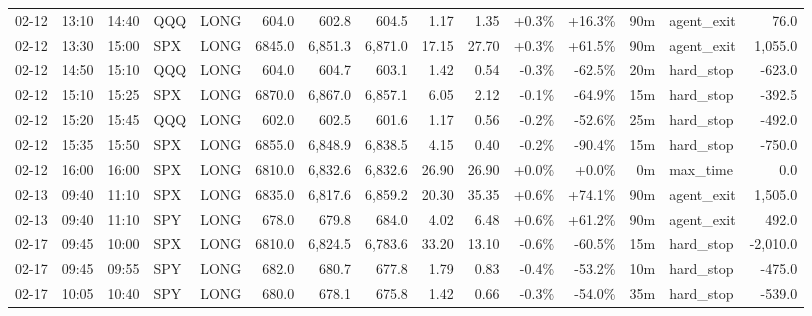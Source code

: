 \documentclass[11pt,a4paper,twoside]{article}
\begin{document}
\begin{landscape}
\begin{center}
\begin{longtable}{>{\color{txtmain}}l l l l l r r r r r r r r >{\color{txtmain}}l r}
02-12 & 13:10 & 14:40 & QQQ & LONG & 604.0 & 602.8 & 604.5 & 1.17 & 1.35 & \textcolor{wingreen}{+0.3\%} & \textcolor{wingreen}{+16.3\%} & 90m & agent\_exit & \textcolor{wingreen}{76.0} \\
02-12 & 13:30 & 15:00 & SPX & LONG & 6845.0 & 6,851.3 & 6,871.0 & 17.15 & 27.70 & \textcolor{wingreen}{+0.3\%} & \textcolor{wingreen}{+61.5\%} & 90m & agent\_exit & \textcolor{wingreen}{1,055.0} \\
02-12 & 14:50 & 15:10 & QQQ & LONG & 604.0 & 604.7 & 603.1 & 1.42 & 0.54 & \textcolor{lossred}{-0.3\%} & \textcolor{lossred}{-62.5\%} & 20m & hard\_stop & \textcolor{lossred}{-623.0} \\
02-12 & 15:10 & 15:25 & SPX & LONG & 6870.0 & 6,867.0 & 6,857.1 & 6.05 & 2.12 & \textcolor{lossred}{-0.1\%} & \textcolor{lossred}{-64.9\%} & 15m & hard\_stop & \textcolor{lossred}{-392.5} \\
02-12 & 15:20 & 15:45 & QQQ & LONG & 602.0 & 602.5 & 601.6 & 1.17 & 0.56 & \textcolor{lossred}{-0.2\%} & \textcolor{lossred}{-52.6\%} & 25m & hard\_stop & \textcolor{lossred}{-492.0} \\
02-12 & 15:35 & 15:50 & SPX & LONG & 6855.0 & 6,848.9 & 6,838.5 & 4.15 & 0.40 & \textcolor{lossred}{-0.2\%} & \textcolor{lossred}{-90.4\%} & 15m & hard\_stop & \textcolor{lossred}{-750.0} \\
02-12 & 16:00 & 16:00 & SPX & LONG & 6810.0 & 6,832.6 & 6,832.6 & 26.90 & 26.90 & \textcolor{wingreen}{+0.0\%} & \textcolor{wingreen}{+0.0\%} & 0m & max\_time & \textcolor{wingreen}{0.0} \\
02-13 & 09:40 & 11:10 & SPX & LONG & 6835.0 & 6,817.6 & 6,859.2 & 20.30 & 35.35 & \textcolor{wingreen}{+0.6\%} & \textcolor{wingreen}{+74.1\%} & 90m & agent\_exit & \textcolor{wingreen}{1,505.0} \\
02-13 & 09:40 & 11:10 & SPY & LONG & 678.0 & 679.8 & 684.0 & 4.02 & 6.48 & \textcolor{wingreen}{+0.6\%} & \textcolor{wingreen}{+61.2\%} & 90m & agent\_exit & \textcolor{wingreen}{492.0} \\
02-17 & 09:45 & 10:00 & SPX & LONG & 6810.0 & 6,824.5 & 6,783.6 & 33.20 & 13.10 & \textcolor{lossred}{-0.6\%} & \textcolor{lossred}{-60.5\%} & 15m & hard\_stop & \textcolor{lossred}{-2,010.0} \\
02-17 & 09:45 & 09:55 & SPY & LONG & 682.0 & 680.7 & 677.8 & 1.79 & 0.83 & \textcolor{lossred}{-0.4\%} & \textcolor{lossred}{-53.2\%} & 10m & hard\_stop & \textcolor{lossred}{-475.0} \\
02-17 & 10:05 & 10:40 & SPY & LONG & 680.0 & 678.1 & 675.8 & 1.42 & 0.66 & \textcolor{lossred}{-0.3\%} & \textcolor{lossred}{-54.0\%} & 35m & hard\_stop & \textcolor{lossred}{-539.0} \\

\end{longtable}
\end{center}
\end{landscape}
\end{document}
